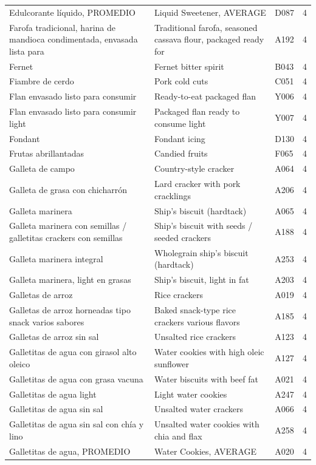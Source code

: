 {\begin{longtable}{p{4.3cm}p{5.5cm}p{1.5cm}p{0.7cm}}
Edulcorante líquido, PROMEDIO & Liquid Sweetener, AVERAGE & D087 & 4\\
Farofa tradicional, harina de mandioca condimentada, envasada lista para & Traditional farofa, seasoned cassava flour, packaged ready for & A192 & 4\\
Fernet & Fernet bitter spirit & B043 & 4\\
Fiambre de cerdo & Pork cold cuts & C051 & 4\\
Flan envasado listo para consumir & Ready-to-eat packaged flan & Y006 & 4\\
Flan envasado listo para consumir light & Packaged flan ready to consume light & Y007 & 4\\
Fondant & Fondant icing & D130 & 4\\
Frutas abrillantadas & Candied fruits & F065 & 4\\
Galleta de campo & Country-style cracker & A064 & 4\\
Galleta de grasa con chicharrón & Lard cracker with pork cracklings & A206 & 4\\
Galleta marinera & Ship's biscuit (hardtack) & A065 & 4\\
Galleta marinera con semillas / galletitas crackers con semillas & Ship's biscuit with seeds / seeded crackers & A188 & 4\\
Galleta marinera integral & Wholegrain ship's biscuit (hardtack) & A253 & 4\\
Galleta marinera, light en grasas & Ship's biscuit, light in fat & A203 & 4\\
Galletas de arroz & Rice crackers & A019 & 4\\
Galletas de arroz horneadas tipo snack varios sabores & Baked snack-type rice crackers various flavors & A185 & 4\\
Galletas de arroz sin sal & Unsalted rice crackers & A123 & 4\\
Galletitas de agua con girasol alto oleico & Water cookies with high oleic sunflower & A127 & 4\\
Galletitas de agua con grasa vacuna & Water biscuits with beef fat & A021 & 4\\
Galletitas de agua light & Light water cookies & A247 & 4\\
Galletitas de agua sin sal & Unsalted water crackers & A066 & 4\\
Galletitas de agua sin sal con chía y lino & Unsalted water cookies with chia and flax & A258 & 4\\
Galletitas de agua, PROMEDIO & Water Cookies, AVERAGE & A020 & 4\\

\end{longtable}}
